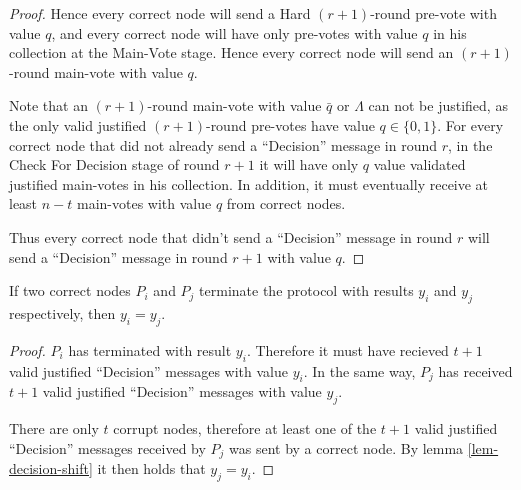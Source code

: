 \begin{proof}
   Hence every correct node will send a Hard $(r+1)$-round pre-vote with value
   $q$, and every correct node will have only pre-votes with value $q$ in his
   collection at the Main-Vote stage. Hence every correct node will send an
   $(r+1)$-round main-vote with value $q$. 
   
   Note that an $(r+1)$-round main-vote with value $\bar{q}$ or $\Lambda$ can not
   be justified, as the only valid justified $(r+1)$-round pre-votes have value
   $q \in \{0,1\}$. For every correct node that did not already send a
   ``Decision'' message in round $r$, in the Check For Decision stage of round
   $r+1$ it will have only $q$ value validated justified main-votes in his
   collection. In addition, it must eventually receive at least $n-t$ main-votes
   with value $q$ from correct nodes.
   
   Thus every correct node that didn't send a ``Decision'' message in round $r$
   will send a ``Decision'' message in round $r+1$ with value $q$.
\end{proof}

\begin{lem}
  If two correct nodes $P_i$ and $P_j$ terminate the protocol with results $y_i$
  and $y_j$ respectively, then $y_i = y_j$.
\end{lem}
\begin{proof}
  $P_i$ has terminated with result $y_i$. Therefore it must have recieved $t+1$
  valid justified ``Decision'' messages with value $y_i$. In the same way, $P_j$
  has received $t+1$ valid justified ``Decision'' messages with value $y_j$.
  
  There are only $t$ corrupt nodes, therefore at least one of the $t+1$ valid
  justified ``Decision'' messages received by $P_j$ was sent by a correct node.
  By lemma \ref{lem-decision-shift} it then holds that $y_j = y_i$.
\end{proof}


